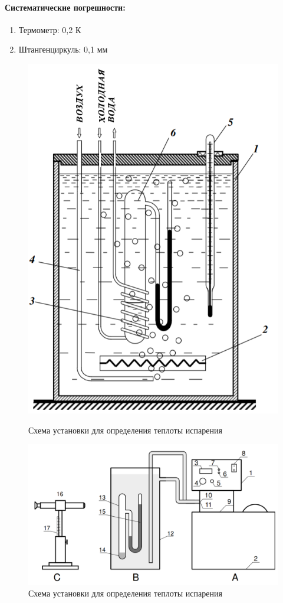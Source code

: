 \documentclass[a4paper,12pt]{article}
\begin{document}
\paragraph{Систематические погрешности:}
\begin{enumerate}
\itemsep0em
\item Термометр: 0,2 К
\item Штангенциркуль: 0,1 мм
\end{enumerate}

\begin{figure}[h]
\begin{center}
\begin{minipage}[h]{0.4\linewidth}
\includegraphics[width=0.65\linewidth]{ustanovka_1.png}
\caption{Схема установки для определения теплоты испарения}
\label{ris:ustanovka_1} 
\end{minipage}
\hfill
\begin{minipage}[h]{0.5\linewidth}
\includegraphics[width=1.3\linewidth]{ustanovka_2.png}
\caption{Схема установки для определения теплоты испарения}
\label{ris:ustanovka_2}
\end{minipage}
\end{center}
\end{figure}
\end{document}
